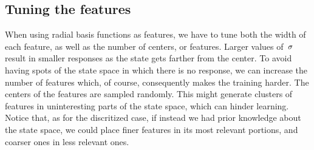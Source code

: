 \subsection{Tuning the features}
When using radial basis functions as features, we have to tune both the width of each feature, as well as the number of centers, or features. Larger values of~${\sigma}$ result in smaller responses as the state gets farther from the center. To avoid having spots of the state space in which there is no response, we can increase the number of features which, of course, consequently makes the training harder. The centers of the features are sampled randomly. This might generate clusters of features in uninteresting parts of the state space, which can hinder learning. Notice that, as for the discritized case, if instead we had prior knowledge about the state space, we could place finer features in its most relevant portions, and coarser ones in less relevant ones.

